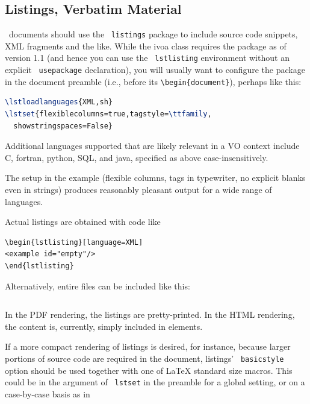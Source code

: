\documentclass[11pt,a4paper]{ivoa}
\newcommand{\texword}[1]{\texttt{\color{texcolor} #1}}
\begin{document}
\subsection{Listings, Verbatim Material}

\ivoatex\ documents should use the \texword{listings} package to include
source code snippets, XML fragments and the like.  While the ivoa class
requires the package as of version 1.1 (and hence you can use the
\texword{lstlisting} environment without an explicit
\texword{usepackage} declaration), you will usually want to configure
the package in the document preamble (i.e., before its
\verb|\begin{document}|), perhaps like this:

\begin{lstlisting}[language=TeX]
\lstloadlanguages{XML,sh}
\lstset{flexiblecolumns=true,tagstyle=\ttfamily,
  showstringspaces=False}
\end{lstlisting}

Additional
languages supported that are likely relevant in a VO context include C,
fortran, python, SQL, and java, specified as above case-insensitively.

The setup in the example (flexible columns, tags in
typewriter, no explicit blanks even in strings) 
produces reasonably pleasant output for a wide range of languages.

Actual listings are obtained with code like
\begin{verbatim}
\begin{lstlisting}[language=XML]
<example id="empty"/>
\end{lstlisting}
\end{verbatim}
Alternatively, entire files can be included like this:
\begin{verbatim}

\end{verbatim}
In the PDF rendering, the listings are pretty-printed.  In the HTML
rendering, the content is, currently, simply included in  elements.

If a more compact rendering of listings is desired, for instance,
because larger portions of source code are required in the document,
listings' \texword{basicstyle} option should be used together with one
of LaTeX standard size macros.  This could be in the argument of
\texword{lstset} in the preamble for a global setting, or on a
case-by-case basis as in


\end{document}
